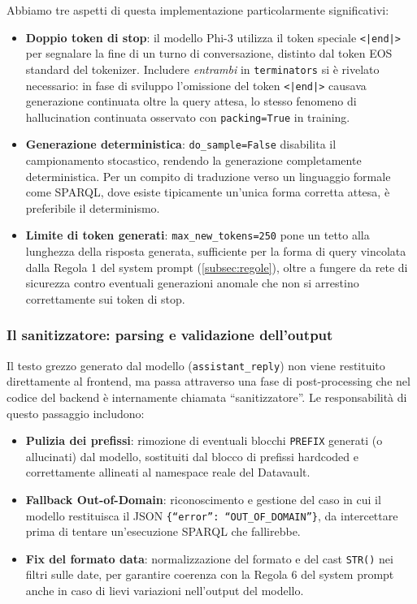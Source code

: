\documentclass[12pt,a4paper,oneside]{book}
\newcommand{\code}[1]{\colorbox{light-gray}{\texttt{#1}}}
\begin{document}
\newpage

Abbiamo tre aspetti di questa implementazione particolarmente significativi:

\begin{itemize}
  \item \textbf{Doppio token di stop}: il modello Phi-3 utilizza il token speciale \code{<|end|>} per segnalare la fine di un turno di conversazione, distinto dal token EOS standard del tokenizer. Includere \emph{entrambi} in \code{terminators} si è rivelato necessario: in fase di sviluppo l'omissione del token \code{<|end|>} causava generazione continuata oltre la query attesa, lo stesso fenomeno di hallucination continuata osservato con \code{packing=True} in training.
  \item \textbf{Generazione deterministica}: \code{do\_sample=False} disabilita il campionamento stocastico, rendendo la generazione completamente deterministica. Per un compito di traduzione verso un linguaggio formale come SPARQL, dove esiste tipicamente un'unica forma corretta attesa, è preferibile il determinismo.
  \item \textbf{Limite di token generati}: \code{max\_new\_tokens=250} pone un tetto alla lunghezza della risposta generata, sufficiente per la forma di query vincolata dalla Regola 1 del system prompt (\cref{subsec:regole}), oltre a fungere da rete di sicurezza contro eventuali generazioni anomale che non si arrestino correttamente sui token di stop.
\end{itemize}

\subsubsection{Il sanitizzatore: parsing e validazione dell'output}

Il testo grezzo generato dal modello (\code{assistant\_reply}) non viene restituito direttamente al frontend, ma passa attraverso una fase di post-processing che nel codice del backend è internamente chiamata ``sanitizzatore''. Le responsabilità di questo passaggio includono:

\begin{itemize}
    \item \textbf{Pulizia dei prefissi}: rimozione di eventuali blocchi \code{PREFIX} generati (o allucinati) dal modello, sostituiti dal blocco di prefissi hardcoded e correttamente allineati al namespace reale del Datavault.
    \item \textbf{Fallback Out-of-Domain}: riconoscimento e gestione del caso in cui il modello restituisca il JSON \code{\{``error'': ``OUT\_OF\_DOMAIN''\}}, da intercettare prima di tentare un'esecuzione SPARQL che fallirebbe.
    \item \textbf{Fix del formato data}: normalizzazione del formato e del cast \code{STR()} nei filtri sulle date, per garantire coerenza con la Regola 6 del system prompt anche in caso di lievi variazioni nell'output del modello. \end{itemize}
\end{document}
